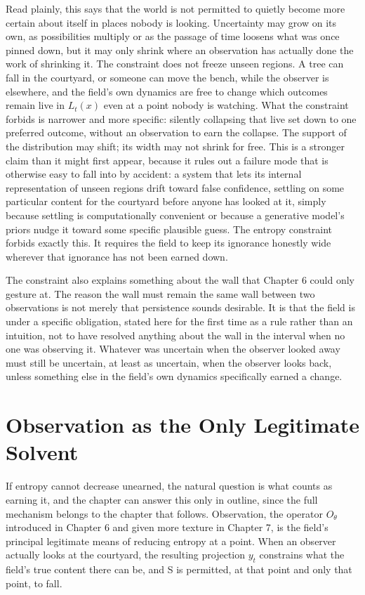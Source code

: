 Read plainly, this says that the world is not permitted to quietly become more certain about itself in places nobody is looking. Uncertainty may grow on its own, as possibilities multiply or as the passage of time loosens what was once pinned down, but it may only shrink where an observation has actually done the work of shrinking it. The constraint does not freeze unseen regions. A tree can fall in the courtyard, or someone can move the bench, while the observer is elsewhere, and the field's own dynamics are free to change which outcomes remain live in \(L_t(x)\) even at a point nobody is watching. What the constraint forbids is narrower and more specific: silently collapsing that live set down to one preferred outcome, without an observation to earn the collapse. The support of the distribution may shift; its width may not shrink for free. This is a stronger claim than it might first appear, because it rules out a failure mode that is otherwise easy to fall into by accident: a system that lets its internal representation of unseen regions drift toward false confidence, settling on some particular content for the courtyard before anyone has looked at it, simply because settling is computationally convenient or because a generative model's priors nudge it toward some specific plausible guess. The entropy constraint forbids exactly this. It requires the field to keep its ignorance honestly wide wherever that ignorance has not been earned down.

The constraint also explains something about the wall that Chapter 6 could only gesture at. The reason the wall must remain the same wall between two observations is not merely that persistence sounds desirable. It is that the field is under a specific obligation, stated here for the first time as a rule rather than an intuition, not to have resolved anything about the wall in the interval when no one was observing it. Whatever was uncertain when the observer looked away must still be uncertain, at least as uncertain, when the observer looks back, unless something else in the field's own dynamics specifically earned a change.

\section{Observation as the Only Legitimate Solvent}

If entropy cannot decrease unearned, the natural question is what counts as earning it, and the chapter can answer this only in outline, since the full mechanism belongs to the chapter that follows. Observation, the operator \(O_\theta\) introduced in Chapter 6 and given more texture in Chapter 7, is the field's principal legitimate means of reducing entropy at a point. When an observer actually looks at the courtyard, the resulting projection \(y_t\) constrains what the field's true content there can be, and S is permitted, at that point and only that point, to fall.

